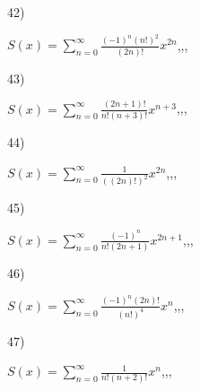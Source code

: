 \documentclass[11pt, ukrainian]{article}
\begin{document}
42) \space 
{%
{$S(x)=\sum\limits_{n=0}^{\infty}{\frac{{(-1)^n}{(n!)^2}}{(2n)!}}{x^{{2n}}}$},,, \par \smallskip  
}
\par
\vspace{0.9cm}
43) \space 
{%
{$S(x)=\sum\limits_{n=0}^{\infty}{\frac{(2n+1)!}{n!(n+3)!}}{x^{{n+3}}}$},,, \par \smallskip  
}
\par
\vspace{0.9cm}
44) \space 
{%
{$S(x)=\sum\limits_{n=0}^{\infty}{\frac{1}{((2n)!)^2}}{x^{{2n}}}$},,, \par \smallskip  
}
\par
\vspace{0.9cm}
45) \space 
{%
{$S(x)=\sum\limits_{n=0}^{\infty}{\frac{(-1)^n}{n!(2n+1)}}{x^{{2n+1}}}$},,, \par \smallskip  
}
\par
\vspace{0.9cm}
46) \space 
{%
{$S(x)=\sum\limits_{n=0}^{\infty}{\frac{{(-1)^n}(2n)!}{(n!)^4}}{x^{{n}}}$},,, \par \smallskip  
}
\par
\vspace{0.9cm}
47) \space 
{%
{$S(x)=\sum\limits_{n=0}^{\infty}{\frac{1}{n!(n+2)!}}{x^{{n}}}$},,, \par \smallskip  
}
\end{document}

